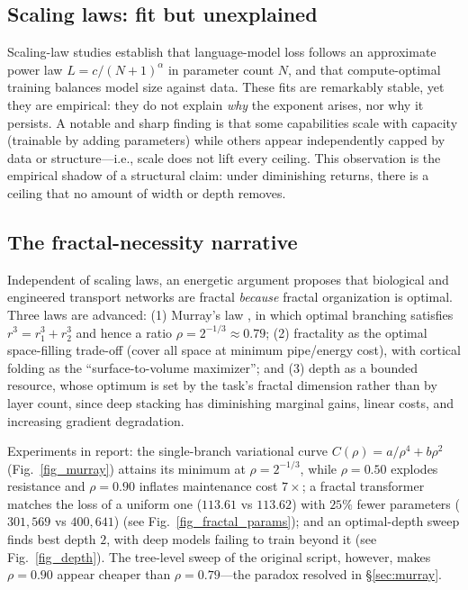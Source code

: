 \documentclass[conference]{IEEEtran}
\begin{document}
\subsection{Scaling laws: fit but unexplained}
\label{sec:scaling}
Scaling-law studies \cite{kaplan2020scaling,hoffmann2022train,brown2020language}
establish that language-model loss follows an approximate power law
$L=c/(N+1)^\alpha$ in parameter count $N$, and that compute-optimal training
balances model size against data. These fits are remarkably stable, yet they are
empirical: they do not explain \emph{why} the exponent arises, nor why it
persists. A notable and sharp finding is that some capabilities scale with
capacity (trainable by adding parameters) while others appear independently
capped by data or structure---i.e., scale does not lift every ceiling. This
observation is the empirical shadow of a structural claim: under diminishing
returns, there is a ceiling that no amount of width or depth removes.

\subsection{The fractal-necessity narrative}
\label{sec:fractal-finding}
Independent of scaling laws, an energetic argument \cite{shape2026} proposes that
biological and engineered transport networks are fractal \emph{because} fractal
organization is optimal. Three laws are advanced: (1) Murray's law
\cite{murray1926}, in which optimal branching satisfies $r^3=r_1^3+r_2^3$ and
hence a ratio $\rho=2^{-1/3}\approx0.79$; (2) fractality as the optimal
space-filling trade-off (cover all space at minimum pipe/energy cost), with
cortical folding as the ``surface-to-volume maximizer''; and (3) depth as a
bounded resource, whose optimum is set by the task's fractal dimension rather
than by layer count, since deep stacking has diminishing marginal gains, linear
costs, and increasing gradient degradation.

Experiments in \cite{shape2026} report: the single-branch variational curve
$C(\rho)=a/\rho^4+b\rho^2$ (Fig.~\ref{fig_murray}) attains its minimum at
$\rho=2^{-1/3}$, while $\rho=0.50$ explodes resistance and $\rho=0.90$ inflates
maintenance cost $7\times$; a fractal transformer matches the loss of a uniform
one ($113.61$ vs $113.62$) with $25\%$ fewer parameters ($301{,}569$ vs
$400{,}641$) (see Fig.~\ref{fig_fractal_params}); and an optimal-depth sweep
finds best depth $2$, with deep models failing to train beyond it (see
Fig.~\ref{fig_depth}). The tree-level sweep of the original script, however,
makes $\rho=0.90$ appear cheaper than $\rho=0.79$---the paradox resolved in
\S\ref{sec:murray}.
\end{document}
